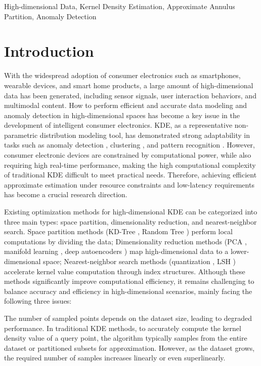 \documentclass[conference]{IEEEtran}
\begin{document}
\begin{IEEEkeywords}
High-dimensional Data, Kernel Density Estimation, Approximate Annulus Partition, Anomaly Detection
\end{IEEEkeywords}



\section{Introduction}
With the widespread adoption of consumer electronics such as smartphones, wearable devices, and smart home products, a large amount of high-dimensional data has been generated, including sensor signals, user interaction behaviors, and multimodal content. How to perform efficient and accurate data modeling and anomaly detection in high-dimensional spaces has become a key issue in the development of intelligent consumer electronics. KDE, as a representative non-parametric distribution modeling tool, has demonstrated strong adaptability in tasks such as anomaly detection \cite{reff1}, clustering \cite{reff2,reff3}, and pattern recognition \cite{reff4}. However, consumer electronic devices are constrained by computational power, while also requiring high real-time performance, making the high computational complexity of traditional KDE difficult to meet practical needs. Therefore, achieving efficient approximate estimation under resource constraints and low-latency requirements has become a crucial research direction.

Existing optimization methods for high-dimensional KDE can be categorized into three main types: space partition, dimensionality reduction, and nearest-neighbor search.
Space partition methods (KD-Tree \cite{reff6}, Random Tree \cite{reff7}) perform local computations by dividing the data;
Dimensionality reduction methods (PCA \cite{reff10}, manifold learning \cite{reff12}, deep autoencoders \cite{reff9}) map high-dimensional data to a lower-dimensional space;
Nearest-neighbor search methods (quantization \cite{reff15,reff16}, LSH \cite{reff17,reff18}) accelerate kernel value computation through index structures.
Although these methods significantly improve computational efficiency, it remains challenging to balance accuracy and efficiency in high-dimensional scenarios, mainly facing the following three issues:

The number of sampled points depends on the dataset size, leading to degraded performance.
In traditional KDE methods, to accurately compute the kernel density value of a query point, the algorithm typically samples from the entire dataset or partitioned subsets for approximation. However, as the dataset grows, the required number of samples increases linearly or even superlinearly.
\end{document}
